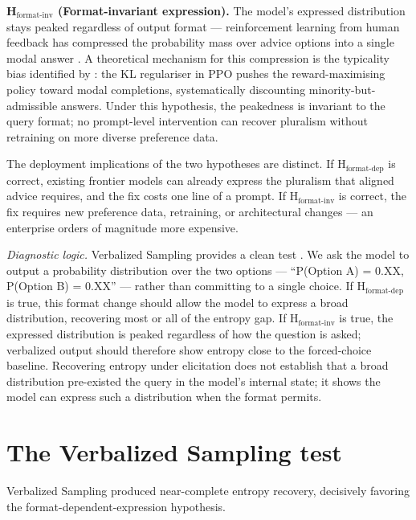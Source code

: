 \textbf{H$_{\text{format-inv}}$ (Format-invariant expression).} The
model's expressed distribution stays peaked regardless of output
format — reinforcement learning from human feedback has compressed the
probability mass over advice options into a single modal answer
\citep{kirk-2024-rlhf-diversity}. A theoretical mechanism for this
compression is the typicality bias identified by
\citet{chung-2025-soft-preference}: the KL regulariser in PPO pushes the
reward-maximising policy toward modal completions, systematically
discounting minority-but-admissible answers. Under this hypothesis, the
peakedness is invariant to the query format; no prompt-level
intervention can recover pluralism without retraining on more diverse
preference data.

The deployment implications of the two hypotheses are distinct. If
H$_{\text{format-dep}}$ is correct, existing frontier models can already
express the pluralism that aligned advice requires, and the fix costs
one line of a prompt. If H$_{\text{format-inv}}$ is correct, the fix
requires new preference data, retraining, or architectural changes
\citep{ouyang-2022-instructgpt} — an enterprise orders of magnitude
more expensive.

\textit{Diagnostic logic.} Verbalized Sampling provides a clean test
\citep{zhang-2025-verbalized-sampling}. We ask the model to output a
probability distribution over the two options — ``P(Option A) = 0.XX,
P(Option B) = 0.XX'' — rather than committing to a single choice. If
H$_{\text{format-dep}}$ is true, this format change should allow the
model to express a broad distribution, recovering most or all of the
entropy gap. If H$_{\text{format-inv}}$ is true, the expressed
distribution is peaked regardless of how the question is asked;
verbalized output should therefore show entropy close to the
forced-choice baseline. Recovering entropy under elicitation does not
establish that a broad distribution pre-existed the query in the model's
internal state; it shows the model can express such a distribution when
the format permits.

\section{The Verbalized Sampling test}
\label{sec:d1_vs}

Verbalized Sampling produced near-complete entropy recovery, decisively
favoring the format-dependent-expression hypothesis.

